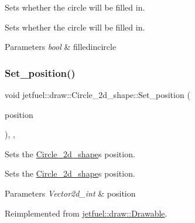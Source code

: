 Sets whether the circle will be filled in. 

Sets whether the circle will be filled in.


\begin{DoxyParams}{Parameters}
{\em bool} & filledincircle \\
\hline
\end{DoxyParams}
\mbox{\label{classjetfuel_1_1draw_1_1Circle__2d__shape_a551b38063543823483f560bf3eebcd2c}} 
\subsubsection{\texorpdfstring{Set\+\_\+position()}{Set\_position()}}
{\footnotesize\ttfamily void jetfuel\+::draw\+::\+Circle\+\_\+2d\+\_\+shape\+::\+Set\+\_\+position (\begin{DoxyParamCaption}\item[{const \hyperlink{classjetfuel_1_1draw_1_1Vector2d}{Vector2d\+\_\+int}}]{position }\end{DoxyParamCaption})\hspace{0.3cm}{\ttfamily [inline]}, {\ttfamily [override]}, {\ttfamily [virtual]}}



Sets the \hyperlink{classjetfuel_1_1draw_1_1Circle__2d__shape}{Circle\+\_\+2d\+\_\+shape}\textquotesingle{}s position. 

Sets the \hyperlink{classjetfuel_1_1draw_1_1Circle__2d__shape}{Circle\+\_\+2d\+\_\+shape}\textquotesingle{}s position.


\begin{DoxyParams}{Parameters}
{\em Vector2d\+\_\+int} & position \\
\hline
\end{DoxyParams}


Reimplemented from \hyperlink{classjetfuel_1_1draw_1_1Drawable_afdd035afe40c706459a6c9df813bcce6}{jetfuel\+::draw\+::\+Drawable}.

\mbox{\label{classjetfuel_1_1draw_1_1Circle__2d__shape_a100c20cab54eaaafca78147854b0a3c3}} 
